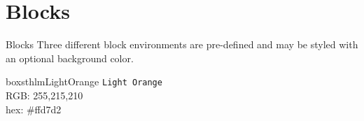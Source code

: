 \documentclass{beamer}
\begin{document}
\section{Blocks}
\begin{frame}{Blocks}
Three different block environments are pre-defined and may be styled with an
optional background color.

\begin{beamercolorbox}[wd=\linewidth,ht=10ex,dp=3ex]{boxsthlmLightOrange}
\centering
\texttt{Light Orange}\\
\vspace{1em}
\tiny{RGB:  255,215,210} \\
\tiny{hex: \#ffd7d2}
\end{beamercolorbox}

\end{frame}
\end{document}
